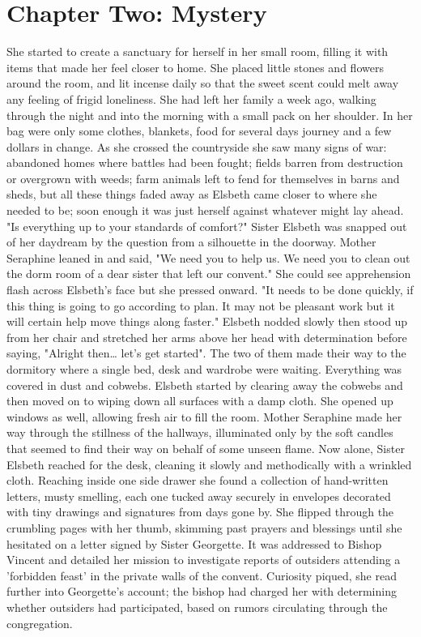 \documentclass[11pt]{article}
\begin{document}
\section{Chapter Two: Mystery}
\label{sec:org7c79a5b}
She started to create a sanctuary for herself in her small room, filling it with items that made her feel closer to home. She placed little stones and flowers around the room, and lit incense daily so that the sweet scent could melt away any feeling of frigid loneliness. She had left her family a week ago, walking through the night and into the morning with a small pack on her shoulder. In her bag were only some clothes, blankets, food for several days journey and a few dollars in change. As she crossed the countryside she saw many signs of war: abandoned homes where battles had been fought; fields barren from destruction or overgrown with weeds; farm animals left to fend for themselves in barns and sheds, but all these things faded away as Elsbeth came closer to where she needed to be; soon enough it was just herself against whatever might lay ahead.
"Is everything up to your standards of comfort?" Sister Elsbeth was snapped out of her daydream by the question from a silhouette in the doorway.
Mother Seraphine leaned in and said, "We need you to help us. We need you to clean out the dorm room of a dear sister that left our convent." She could see apprehension flash across Elsbeth's face but she pressed onward. "It needs to be done quickly, if this thing is going to go according to plan. It may not be pleasant work but it will certain help move things along faster."
Elsbeth nodded slowly then stood up from her chair and stretched her arms above her head with determination before saying, "Alright then\ldots{} let's get started". The two of them made their way to the dormitory where a single bed, desk and wardrobe were waiting. Everything was covered in dust and cobwebs. Elsbeth started by clearing away the cobwebs and then moved on to wiping down all surfaces with a damp cloth. She opened up windows as well, allowing fresh air to fill the room. Mother Seraphine made her way through the stillness of the hallways, illuminated only by the soft candles that seemed to find their way on behalf of some unseen flame.
Now alone, Sister Elsbeth reached for the desk, cleaning it slowly and methodically with a wrinkled cloth. Reaching inside one side drawer she found a collection of hand-written letters, musty smelling, each one tucked away securely in envelopes decorated with tiny drawings and signatures from days gone by. She flipped through the crumbling pages with her thumb, skimming past prayers and blessings until she hesitated on a letter signed by Sister Georgette. It was addressed to Bishop Vincent and detailed her mission to investigate reports of outsiders attending a 'forbidden feast' in the private walls of the convent. Curiosity piqued, she read further into Georgette's account; the bishop had charged her with determining whether outsiders had participated, based on rumors circulating through the congregation.
\end{document}
